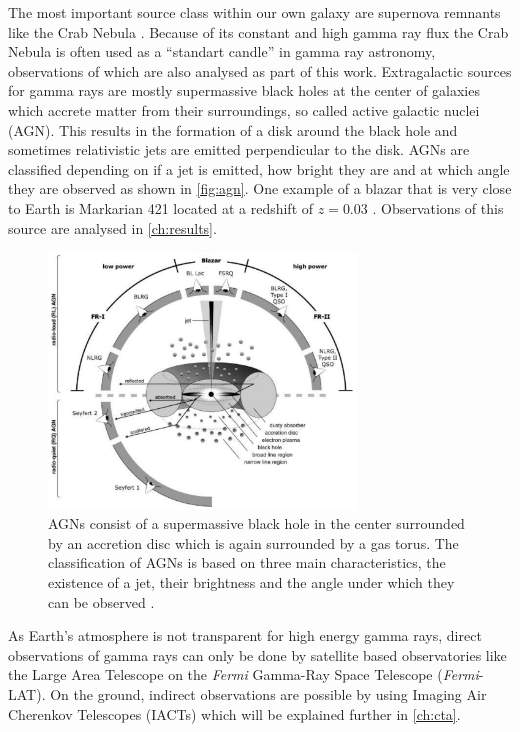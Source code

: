 The most important source class within our own galaxy are supernova remnants like the Crab Nebula \cite{nuimeprn12618}. 
Because of its constant and high gamma ray flux the Crab Nebula is often used as a \enquote{standart candle} in gamma ray astronomy, observations of which are also 
analysed as part of this work.
Extragalactic sources for gamma rays are mostly supermassive black holes at the center of galaxies which accrete matter from their surroundings,
so called active galactic nuclei (AGN).
This results in the formation of a disk around the black hole and sometimes relativistic jets are emitted perpendicular to the disk.
AGNs are classified depending on if a jet is emitted, how bright they are and at which angle they are observed as shown in \autoref{fig:agn}.
One example of a blazar that is very close to Earth is Markarian 421 located at a redshift of $z = \num{0.03}$ \cite{Albert_2007}.
Observations of this source are analysed in \autoref{ch:results}.
\begin{figure}
    \centering
    \includegraphics[width=0.73\textwidth]{images/agn.png}
    \caption{AGNs consist of a supermassive black hole in the center surrounded by an accretion disc which is again surrounded by a gas torus.
        The classification of AGNs is based on three main characteristics, the existence of a jet, their brightness and the angle under which they can be observed \cite{doi:10.1002/9783527666829.ch4}.
    }
    \label{fig:agn}
\end{figure}


As Earth's atmosphere is not transparent for high energy gamma rays, direct observations of gamma rays can only be done by satellite based observatories 
like the Large Area Telescope on the \textit{Fermi} Gamma-Ray Space Telescope (\textit{Fermi}-LAT).
On the ground, indirect observations are possible by using Imaging Air Cherenkov Telescopes (IACTs) which will be explained further in \autoref{ch:cta}.

